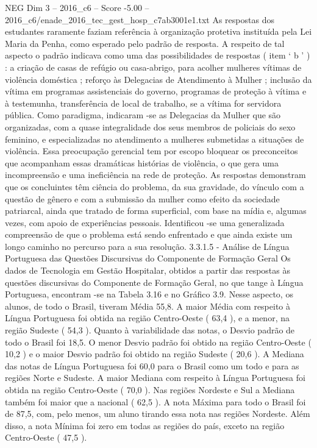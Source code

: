 \begin{textsample}{NEG Dim 3 – 2016\_c6 – Score -5.00 – 2016\_c6/enade\_2016\_tec\_gest\_hosp\_c7ab3001e1.txt}
As respostas dos estudantes raramente faziam referência à organização protetiva instituída pela Lei Maria da Penha, como esperado pelo padrão de resposta.
A respeito de tal aspecto o padrão indicava como uma das possibilidades de respostas ( item ‘ b ’ ) : a criação de casas de refúgio ou casa-abrigo, para acolher mulheres vítimas de violência doméstica ; reforço às Delegacias de Atendimento à Mulher ; inclusão da vítima em programas assistenciais do governo, programas de proteção à vítima e à testemunha, transferência de local de trabalho, se a vítima for servidora pública.
Como paradigma, indicaram -se as Delegacias da Mulher que são organizadas, com a quase integralidade dos seus membros de policiais do sexo feminino, e especializadas no atendimento a mulheres submetidas a situações de violência.
Essa preocupação gerencial tem por escopo bloquear os preconceitos que acompanham essas dramáticas histórias de violência, o que gera uma incompreensão e uma ineficiência na rede de proteção.
As respostas demonstram que os concluintes têm ciência do problema, da sua gravidade, do vínculo com a questão de gênero e com a submissão da mulher como efeito da sociedade patriarcal, ainda que tratado de forma superficial, com base na mídia e, algumas vezes, com apoio de experiências pessoais.
Identificou -se uma generalizada compreensão de que o problema está sendo enfrentado e que ainda existe um longo caminho no percurso para a sua resolução. 3.3.1.5 - Análise de Língua Portuguesa das Questões Discursivas do Componente de Formação Geral Os dados de Tecnologia em Gestão Hospitalar, obtidos a partir das respostas às questões discursivas do Componente de Formação Geral, no que tange à Língua Portuguesa, encontram -se na Tabela 3.16 e no Gráfico 3.9.
Nesse aspecto, os alunos, de todo o Brasil, tiveram Média 55,8.
A maior Média com respeito à Língua Portuguesa foi obtida na região Centro-Oeste ( 63,4 ), e a menor, na região Sudeste ( 54,3 ).
Quanto à variabilidade das notas, o Desvio padrão de todo o Brasil foi 18,5.
O menor Desvio padrão foi obtido na região Centro-Oeste ( 10,2 ) e o maior Desvio padrão foi obtido na região Sudeste ( 20,6 ).
A Mediana das notas de Língua Portuguesa foi 60,0 para o Brasil como um todo e para as regiões Norte e Sudeste.
A maior Mediana com respeito à Língua Portuguesa foi obtida na região Centro-Oeste ( 70,0 ).
Nas regiões Nordeste e Sul a Mediana também foi maior que a nacional ( 62,5 ).
A nota Máxima para todo o Brasil foi de 87,5, com, pelo menos, um aluno tirando essa nota nas regiões Nordeste.
Além disso, a nota Mínima foi zero em todas as regiões do país, exceto na região Centro-Oeste ( 47,5 ).

\end{textsample}

